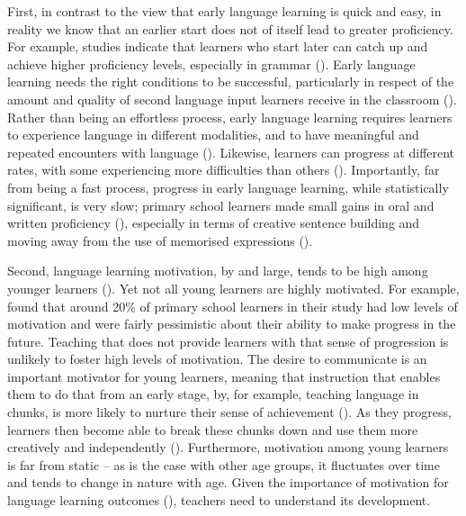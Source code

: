 \documentclass[output=paper]{langscibook}
\begin{document}
First, in contrast to the view that early language learning is quick and easy, in reality we know that an earlier start does not of itself lead to greater proficiency. For example, studies indicate that learners who start later can catch up and achieve higher proficiency levels, especially in grammar (\citealt{MylesMitchell2012}). Early language learning needs the right conditions to be successful, particularly in respect of the amount and quality of second language input learners receive in the classroom (\citealt{GrahamEtAl2017,MitchellMyles2019}). Rather than being an effortless process, early language learning requires learners to experience language in different modalities, and to have meaningful and repeated encounters with language (\citealt{MitchellMyles2019,MylesMitchell2012,Porter2020}). Likewise, learners can progress at different rates, with some experiencing more difficulties than others (\citealt{CableEtAl2010,GrahamEtAl2017,Porter2020}).  Importantly, far from being a fast process, progress in early language learning, while statistically significant, is very slow; primary school learners made small gains in oral and written proficiency (\citealt{Courtney2014,GrahamEtAl2017,MitchellMyles2019,MylesMitchell2012,Porter2020}), especially in terms of creative sentence building and moving away from the use of memorised expressions (\citealt{CableEtAl2010}).

Second, language learning motivation, by and large, tends to be high among younger learners (\citealt{CableEtAl2010}). Yet not all young learners are highly motivated. For example, \citet{CourtneyEtAl2017} found that around 20\% of primary school learners in their study had low levels of motivation and were fairly pessimistic about their ability to make progress in the future.  Teaching that does not provide learners with that sense of progression is unlikely to foster high levels of motivation. The desire to communicate is an important motivator for young learners, meaning that instruction that enables them to do that from an early stage, by, for example, teaching language in chunks, is more likely to nurture their sense of achievement (\citealt{CableEtAl2010}). As they progress, learners then become able to break these chunks down and use them more creatively and independently (\citealt{MylesEtAl1998}). Furthermore, motivation among young learners is far from static -- as is the case with other age groups, it fluctuates over time and tends to change in nature with age. Given the importance of motivation for language learning outcomes (\citealt{DörnyeiSkehan2003}), teachers need to understand its development.
\end{document}
